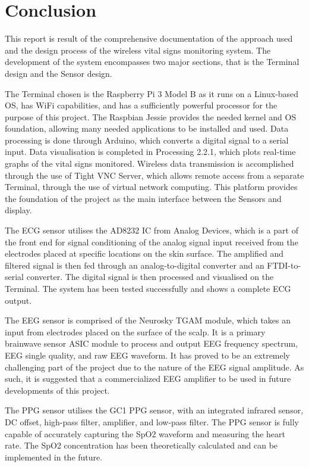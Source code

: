 \chapter{Conclusion }  
\label{Conclusion}

This report is result of the comprehensive documentation of the approach used and the design process of the wireless vital signs monitoring system. The development of the system encompasses two major sections, that is the Terminal design and the Sensor design. 

The Terminal chosen is the Raspberry Pi 3 Model B as it runs on a Linux-based OS, has WiFi capabilities, and has a sufficiently powerful processor for the purpose of this project. The Raspbian Jessie provides the needed kernel and OS foundation, allowing many needed applications to be installed and used. Data processing is done through Arduino, which converts a digital signal to a serial input. Data visualisation is completed in Processing 2.2.1, which plots real-time graphs of the vital signs monitored. Wireless data transmission is accomplished through the use of Tight VNC Server, which allows remote access from a separate Terminal, through the use of virtual network computing. This platform provides the foundation of the project as the main interface between the Sensors and display. 

The ECG sensor utilises the AD8232 IC from Analog Devices, which is a part of the front end for signal conditioning of the analog signal input received from the electrodes placed at specific locations on the skin surface. The amplified and filtered signal is then fed through an analog-to-digital converter and an FTDI-to-serial converter. The digital signal is then processed and visualised on the Terminal. The system has been tested successfully and shows a complete ECG output. 

The EEG sensor is comprised of the Neurosky TGAM module, which takes an input from electrodes placed on the surface of the scalp. It is a primary brainwave sensor ASIC module to process and output EEG frequency spectrum, EEG single quality, and raw EEG waveform. It has proved to be an extremely challenging part of the project due to the nature of the EEG signal amplitude. As such, it is suggested that a commercialized EEG amplifier to be used in future developments of this project. 

The PPG sensor utilises the GC1 PPG sensor, with an integrated infrared sensor, DC offset, high-pass filter, amplifier, and low-pass filter. The PPG sensor is fully capable of accurately capturing the SpO2 waveform and measuring the heart rate. The SpO2 concentration has been theoretically calculated and can be implemented in the future. 

